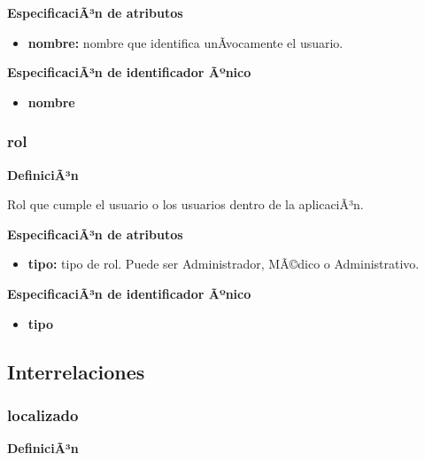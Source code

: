 \documentclass[a4paper,11pt]{article}
\begin{document}
\textbf{EspecificaciÃ³n de atributos}

\begin{itemize}

     \item \textbf{nombre:} nombre que identifica unÃ­vocamente el usuario. 

\end{itemize}

\textbf{EspecificaciÃ³n de identificador Ãºnico}

\begin{itemize}

     \item \textbf{nombre}

\end{itemize}

\subsubsection{\textbf{rol}}

\textbf{DefiniciÃ³n}

Rol que cumple el usuario o los usuarios dentro de la aplicaciÃ³n.

\textbf{EspecificaciÃ³n de atributos}

\begin{itemize}

     \item \textbf{tipo:} tipo de rol. Puede ser Administrador, MÃ©dico o Administrativo. 

\end{itemize}

\textbf{EspecificaciÃ³n de identificador Ãºnico}

\begin{itemize}

     \item \textbf{tipo}

\end{itemize}



\subsection{\textbf{Interrelaciones}}

\subsubsection{\textbf{localizado}}

\textbf{DefiniciÃ³n}
\end{document}
